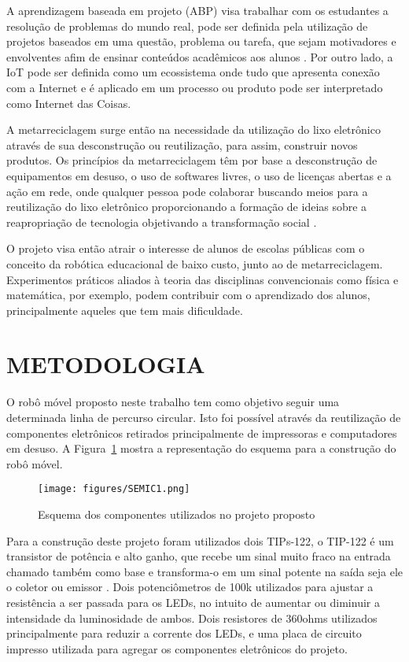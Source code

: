 \documentclass[a0,portrait,brazil]{a0poster}
\begin{document}
\begin{multicols}{3}
\begin{large}
A aprendizagem baseada em projeto (ABP) visa trabalhar com os estudantes a resolução de problemas do mundo real, pode ser definida pela utilização de projetos baseados em uma questão, problema ou tarefa, que sejam motivadores e envolventes afim de ensinar conteúdos acadêmicos aos alunos \cite{abp}. Por outro lado, a IoT pode ser definida como um ecossistema onde tudo que apresenta conexão com a Internet e é aplicado em um processo ou produto pode ser interpretado como Internet das Coisas.
\medskip

A metarreciclagem surge então na necessidade da utilização do lixo eletrônico através de sua desconstrução ou reutilização, para assim, construir novos produtos. Os princípios da metarreciclagem têm por base a desconstrução de equipamentos em desuso, o uso de softwares livres, o uso de licenças abertas e a ação em rede, onde qualquer pessoa pode colaborar buscando meios para a reutilização do lixo eletrônico proporcionando a formação de ideias sobre a reapropriação de tecnologia objetivando a transformação social \cite{robo2}.
\medskip

O projeto visa então atrair o interesse de alunos de escolas públicas com o conceito da robótica educacional de baixo custo, junto ao de metarreciclagem. Experimentos práticos aliados à teoria das disciplinas convencionais como física e matemática, por exemplo, podem contribuir com o aprendizado dos alunos, principalmente aqueles que tem mais dificuldade.

\color{black} 
\section*{METODOLOGIA}

O robô móvel proposto neste trabalho tem como objetivo seguir uma determinada linha de percurso circular. Isto foi possível através da reutilização de componentes eletrônicos retirados principalmente de impressoras e computadores em desuso. A Figura~\ref{fig:fig1} mostra a representação do esquema para a construção do robô móvel.
\medskip

\begin{figure}[H]
\centering
\texttt{[image: figures/SEMIC1.png]}
\caption{Esquema dos componentes utilizados no projeto proposto}
\label{fig:fig1}
\end{figure}

Para a construção deste projeto foram utilizados dois TIPs-122, o TIP-122 é um transistor de potência e alto ganho, que recebe um sinal muito fraco na entrada chamado também como base e transforma-o em um sinal potente na saída seja ele o coletor ou emissor \cite{fairchild}. Dois potenciômetros de 100k utilizados para ajustar a resistência a ser passada para os LEDs, no intuito de aumentar ou diminuir a intensidade da luminosidade de ambos. Dois resistores de 360ohms utilizados principalmente para reduzir a corrente dos LEDs, e uma placa de circuito impresso utilizada para agregar os componentes eletrônicos do projeto.



\end{large}
\end{multicols}
\end{document}
